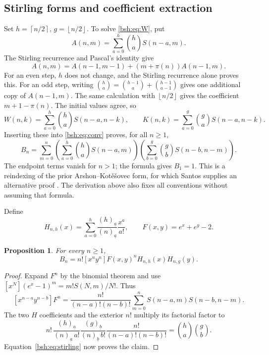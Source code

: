 \documentclass[11pt,letterpaper]{article}
\newtheorem{proposition}[theorem]{Proposition}
\theoremstyle{remark}\newtheorem{remark}[theorem]{Remark}
\newcommand{\fall}[2]{(#1)_{\underline{#2}}}
\newcommand{\ceil}[1]{\left\lceil #1\right\rceil}
\newcommand{\floor}[1]{\left\lfloor #1\right\rfloor}
\begin{document}
\subsection{Stirling forms and coefficient extraction}
Set $h=\ceil{n/2}$, $g=\floor{n/2}$. To solve \eqref{bsh:eq:W}, put
\[
 A(n,m)=\sum_{a=0}^{h}\binom ha S(n-a,m).
\]
The Stirling recurrence and Pascal's identity give
\begin{equation}\label{bsh:eq:Arec}
 A(n,m)=A(n-1,m-1)+(m+\pi(n))A(n-1,m).
\end{equation}
For an even step, $h$ does not change, and the Stirling recurrence alone proves this. For an odd step, writing $\binom ha=\binom{h-1}a+\binom{h-1}{a-1}$ gives one additional copy of $A(n-1,m)$. The same calculation with $\floor{n/2}$ gives the coefficient $m+1-\pi(n)$. The initial values agree, so
\[
 W(n,k)=\sum_{a=0}^{h}\binom ha S(n-a,n-k),\qquad
 K(n,k)=\sum_{a=0}^{g}\binom ga S(n-a,n-k).
\]
Inserting these into \eqref{bsh:eq:conv} proves, for all $n\geq1$,
\begin{equation}\label{bsh:eq:stirling}
 B_n=\sum_{m=0}^n
 \left(\sum_{a=0}^{h}\binom ha S(n-a,m)\right)
 \left(\sum_{b=0}^{g}\binom gb S(n-b,n-m)\right).
\end{equation}
The endpoint terms vanish for $n>1$; the formula gives $B_1=1$. This is a reindexing of the prior Arshon--Kot\v e\v sovec form, for which Santos supplies an alternative proof \cite{santos}. The derivation above also fixes all conventions without assuming that formula.

Define
\begin{equation}\label{bsh:eq:H}
 H_{n,h}(x)=\sum_{a=0}^{h}\frac{\fall h a}{\fall n a}\frac{x^a}{a!},
 \qquad F(x,y)=e^x+e^y-2.
\end{equation}
\begin{proposition}\label{bsh:prop:exact}
For every $n\geq1$,
\begin{equation}\label{bsh:eq:coefficient}
 B_n=n![x^ny^n]F(x,y)^n H_{n,h}(x)H_{n,g}(y).
\end{equation}
\end{proposition}
\begin{proof}
Expand $F^n$ by the binomial theorem and use
$[x^N](e^x-1)^m=m!S(N,m)/N!$. Thus
\[
 [x^{n-a}y^{n-b}]F^n
 =\frac{n!}{(n-a)!(n-b)!}
   \sum_{m=0}^n S(n-a,m)S(n-b,n-m).
\]
The two $H$ coefficients and the exterior $n!$ multiply its factorial factor to
\[
 n!\,\frac{\fall h a}{\fall n a\,a!}
       \frac{\fall g b}{\fall n b\,b!}
       \frac{n!}{(n-a)!(n-b)!}=\binom ha\binom gb.
\]
Equation~\eqref{bsh:eq:stirling} now proves the claim.
\end{proof}
\end{document}
